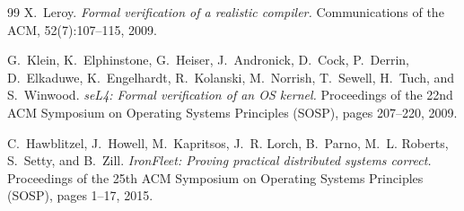 \documentclass[11pt,letterpaper]{article}
\begin{document}
\begin{thebibliography}{99}
X.~Leroy.
\emph{Formal verification of a realistic compiler.}
Communications of the ACM, 52(7):107--115, 2009.

G.~Klein, K.~Elphinstone, G.~Heiser, J.~Andronick, D.~Cock, P.~Derrin,
D.~Elkaduwe, K.~Engelhardt, R.~Kolanski, M.~Norrish, T.~Sewell,
H.~Tuch, and S.~Winwood.
\emph{seL4: Formal verification of an OS kernel.}
Proceedings of the 22nd ACM Symposium on Operating Systems Principles
(SOSP), pages 207--220, 2009.

C.~Hawblitzel, J.~Howell, M.~Kapritsos, J.~R. Lorch, B.~Parno,
M.~L. Roberts, S.~Setty, and B.~Zill.
\emph{IronFleet: Proving practical distributed systems correct.}
Proceedings of the 25th ACM Symposium on Operating Systems Principles
(SOSP), pages 1--17, 2015.
\end{thebibliography}
\end{document}
